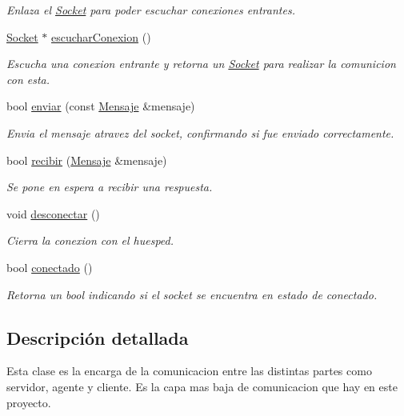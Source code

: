 \begin{DoxyCompactItemize}
\begin{DoxyCompactList}\small\item\em \-Enlaza el \hyperlink{classSocket}{\-Socket} para poder escuchar conexiones entrantes. \end{DoxyCompactList}\item 
\hyperlink{classSocket}{\-Socket} $\ast$ \hyperlink{classSocket_a0dea5b749aa54a23dcdbfb72aceed3c0}{escuchar\-Conexion} ()
\begin{DoxyCompactList}\small\item\em \-Escucha una conexion entrante y retorna un \hyperlink{classSocket}{\-Socket} para realizar la comunicion con esta. \end{DoxyCompactList}\item 
bool \hyperlink{classSocket_a9b61fa7f865eb17e727b1e08a8467274}{enviar} (const \hyperlink{classMensaje}{\-Mensaje} \&mensaje)
\begin{DoxyCompactList}\small\item\em \-Envia el mensaje atravez del socket, confirmando si fue enviado correctamente. \end{DoxyCompactList}\item 
bool \hyperlink{classSocket_a820da69df857dabb200934da3a8a53ae}{recibir} (\hyperlink{classMensaje}{\-Mensaje} \&mensaje)
\begin{DoxyCompactList}\small\item\em \-Se pone en espera a recibir una respuesta. \end{DoxyCompactList}\item 
\hypertarget{classSocket_adc70891a239124b75ceb11275464e981}{void \hyperlink{classSocket_adc70891a239124b75ceb11275464e981}{desconectar} ()}\label{classSocket_adc70891a239124b75ceb11275464e981}

\begin{DoxyCompactList}\small\item\em \-Cierra la conexion con el huesped. \end{DoxyCompactList}\item 
bool \hyperlink{classSocket_acd86b2a177083a141c61afeab3816fab}{conectado} ()
\begin{DoxyCompactList}\small\item\em \-Retorna un bool indicando si el socket se encuentra en estado de conectado. \end{DoxyCompactList}\end{DoxyCompactItemize}


\subsection{\-Descripción detallada}
\-Esta clase es la encarga de la comunicacion entre las distintas partes como servidor, agente y cliente. \-Es la capa mas baja de comunicacion que hay en este proyecto. 


